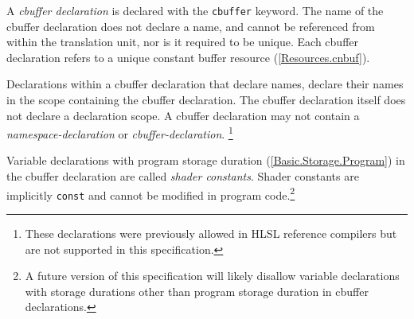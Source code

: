 \p A \textit{cbuffer declaration} is declared with the \texttt{cbuffer} keyword.
The name of the cbuffer declaration does not declare a name, and cannot be
referenced from within the translation unit, nor is it required to be unique.
Each cbuffer declaration refers to a unique constant buffer resource
(\ref{Resources.cnbuf}).

\p Declarations within a cbuffer declaration that declare names, declare their
names in the scope containing the cbuffer declaration. The cbuffer declaration
itself does not declare a declaration scope. A cbuffer declaration may not
contain a \textit{namespace-declaration} or \textit{cbuffer-declaration}.
\footnote{These declarations were previously allowed in HLSL reference compilers
but are not supported in this specification.}

\p Variable declarations with program storage duration
(\ref{Basic.Storage.Program}) in the cbuffer declaration are called
\textit{shader constants}. Shader constants are implicitly \texttt{const} and
cannot be modified in program code.\footnote{A future version of this
specification will likely disallow variable declarations with storage durations
other than program storage duration in cbuffer declarations.}
